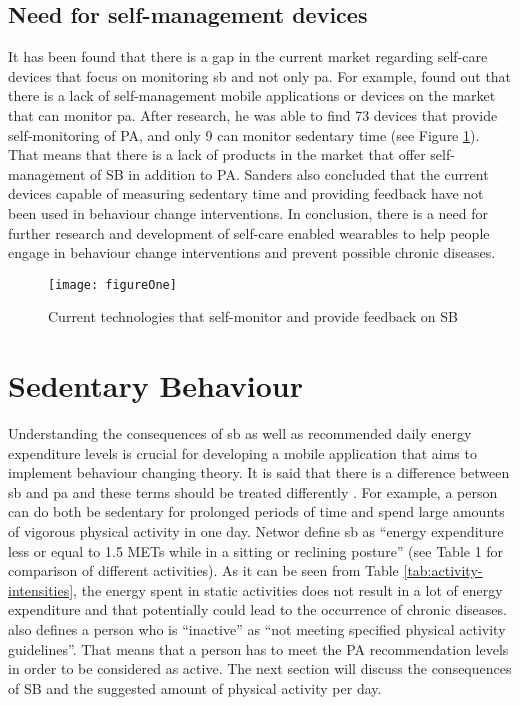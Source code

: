     \subsection{Need for self-management devices}
    It has been found that there is a gap in the current market regarding self-care devices that focus on monitoring \gls{sb} and not only \gls{pa}. For example, \citet{sanders2016} found out that there is a lack of self-management mobile applications or devices on the market that can monitor \gls{pa}. After research, he was able to find 73 devices that provide self-monitoring of PA, and only 9 can monitor sedentary time (see Figure \ref{fig:devices-to-provide-SB-feedback}). That means that there is a lack of products in the market that offer self-management of SB in addition to PA. Sanders also concluded that the current devices capable of measuring sedentary time and providing feedback have not been used in behaviour change interventions. In conclusion, there is a need for further research and development of self-care enabled wearables to help people engage in behaviour change interventions and prevent possible chronic diseases. 
    
    \begin{figure}[h]
        \centering
        \texttt{[image: figureOne]}
        \caption{Current technologies that self-monitor and provide feedback on SB \citep{sanders2016}}
        \label{fig:devices-to-provide-SB-feedback}
    \end{figure}

\section{Sedentary Behaviour}

Understanding the consequences of \gls{sb} as well as recommended daily energy expenditure levels is crucial for developing a mobile application that aims to implement behaviour changing theory. It is said that there is a difference between \gls{sb} and \gls{pa} and these terms should be treated differently \citep[540]{networ2012}. For example, a person can do both be sedentary for prolonged periods of time and spend large amounts of vigorous physical activity in one day. Networ define \gls{sb} as “energy expenditure less or equal to 1.5 METs while in a sitting or reclining posture” (see Table 1 for comparison of different activities). As it can be seen from Table \ref{tab:activity-intensities}, the energy spent in static activities does not result in a lot of energy expenditure and that potentially could lead to the occurrence of chronic diseases. \citet[540]{networ2012} also defines a person who is “inactive” as “not meeting specified physical activity guidelines”. That means that a person has to meet the PA recommendation levels in order to be considered as active. The next section will discuss the consequences of SB and the suggested amount of physical activity per day.
    
